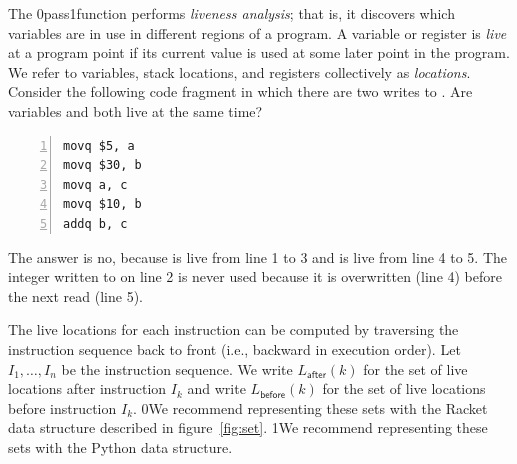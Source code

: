 \documentclass[7x10]{TimesAPriori_MIT}%
\def\racketEd{0}
\def\pythonEd{1}
\def\edition{1}
\newcommand{\racket}[1]{{\if\edition\racketEd{#1}\fi}}
\newcommand{\pythonColor}[0]{}
\newcommand{\python}[1]{{\if\edition\pythonEd\pythonColor #1\fi}}
\numberwithin{theorem}{chapter}
\numberwithin{definition}{chapter}
\numberwithin{equation}{chapter}
\begin{document}
The  \racket{pass}\python{function} performs
\emph{liveness analysis}; that is, it discovers which variables are
in use in different regions of a program.
%
A variable or register is \emph{live} at a program point if its
current value is used at some later point in the program.  We refer to
variables, stack locations, and registers collectively as
\emph{locations}.
%
Consider the following code fragment in which there are two writes to
. Are variables  and  both live at the same
time?
\begin{center}
  \begin{minipage}{0.96\textwidth}
\begin{lstlisting}[numbers=left,numberstyle=\tiny]
movq $5, a
movq $30, b
movq a, c
movq $10, b
addq b, c
\end{lstlisting}
\end{minipage}
\end{center}
The answer is no, because  is live from line 1 to 3 and
 is live from line 4 to 5.  The integer written to  on
line 2 is never used because it is overwritten (line 4) before the
next read (line 5).

The live locations for each instruction can be computed by traversing
the instruction sequence back to front (i.e., backward in execution
order).  Let $I_1,\ldots, I_n$ be the instruction sequence. We write
$L_{\mathsf{after}}(k)$ for the set of live locations after
instruction $I_k$ and write $L_{\mathsf{before}}(k)$ for the set of live
locations before instruction $I_k$.  \racket{We recommend representing
  these sets with the Racket  data structure described in
  figure~\ref{fig:set}.}  \python{We recommend representing these sets
  with the Python
  \href{https://docs.python.org/3.10/library/stdtypes.html\#set-types-set-frozenset}{\code{set}}
  data structure.}
\end{document}

